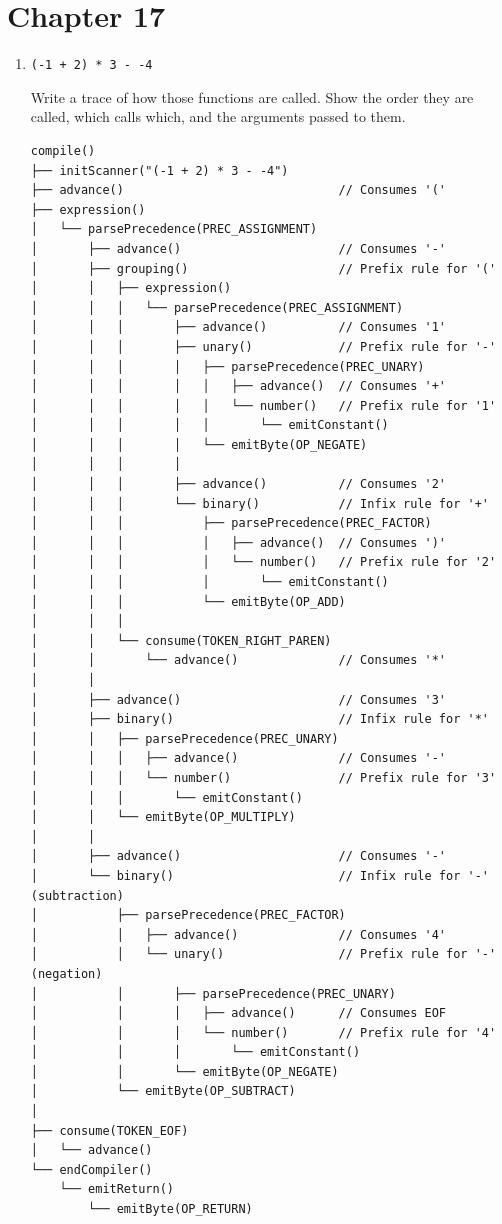 \documentclass{article}
\begin{document}
\section*{Chapter 17}
\begin{enumerate}
    \item {
        \verb|(-1 + 2) * 3 - -4 |

        Write a trace of how those functions are called. Show the order they are called, which calls which, and the arguments passed to them.

        \begin{verbatim}
compile()
├── initScanner("(-1 + 2) * 3 - -4")
├── advance()                              // Consumes '('
├── expression()
│   └── parsePrecedence(PREC_ASSIGNMENT)
│       ├── advance()                      // Consumes '-'
│       ├── grouping()                     // Prefix rule for '('
│       │   ├── expression()
│       │   │   └── parsePrecedence(PREC_ASSIGNMENT)
│       │   │       ├── advance()          // Consumes '1'
│       │   │       ├── unary()            // Prefix rule for '-'
│       │   │       │   ├── parsePrecedence(PREC_UNARY)
│       │   │       │   │   ├── advance()  // Consumes '+'
│       │   │       │   │   └── number()   // Prefix rule for '1'
│       │   │       │   │       └── emitConstant()
│       │   │       │   └── emitByte(OP_NEGATE)
│       │   │       │
│       │   │       ├── advance()          // Consumes '2'
│       │   │       └── binary()           // Infix rule for '+'
│       │   │           ├── parsePrecedence(PREC_FACTOR)
│       │   │           │   ├── advance()  // Consumes ')'
│       │   │           │   └── number()   // Prefix rule for '2'
│       │   │           │       └── emitConstant()
│       │   │           └── emitByte(OP_ADD)
│       │   │
│       │   └── consume(TOKEN_RIGHT_PAREN)
│       │       └── advance()              // Consumes '*'
│       │
│       ├── advance()                      // Consumes '3'
│       ├── binary()                       // Infix rule for '*'
│       │   ├── parsePrecedence(PREC_UNARY)
│       │   │   ├── advance()              // Consumes '-'
│       │   │   └── number()               // Prefix rule for '3'
│       │   │       └── emitConstant()
│       │   └── emitByte(OP_MULTIPLY)
│       │
│       ├── advance()                      // Consumes '-'
│       └── binary()                       // Infix rule for '-' (subtraction)
│           ├── parsePrecedence(PREC_FACTOR)
│           │   ├── advance()              // Consumes '4'
│           │   └── unary()                // Prefix rule for '-' (negation)
│           │       ├── parsePrecedence(PREC_UNARY)
│           │       │   ├── advance()      // Consumes EOF
│           │       │   └── number()       // Prefix rule for '4'
│           │       │       └── emitConstant()
│           │       └── emitByte(OP_NEGATE)
│           └── emitByte(OP_SUBTRACT)
│
├── consume(TOKEN_EOF)
│   └── advance()
└── endCompiler()
    └── emitReturn()
        └── emitByte(OP_RETURN)
        \end{verbatim}
    }


\end{enumerate}
\end{document}

